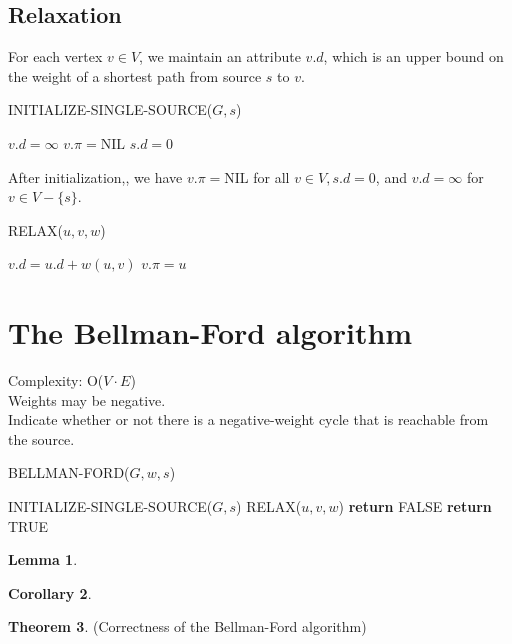\documentclass[letter]{book}
\theoremstyle{definition}
\newtheorem{theorem}{Theorem}[chapter]
\newtheorem{lemma}[theorem]{Lemma}
\newtheorem{corollary}[theorem]{Corollary}
\theoremstyle{definition}
\theoremstyle{remark}
\begin{document}
\subsection*{Relaxation}
    For each vertex $v\in V$, we maintain an attribute $v.d$, which is an upper bound on the weight of a shortest path from source $s$ to $v$.
    \begin{algorithm}[H]%
        \caption{INITIALIZE-SINGLE-SOURCE($G,s$)}
        \begin{algorithmic}[1] %
                \State $v.d=\infty$
                \State $v.\pi=\text{NIL}$
            \EndFor
            \State $s.d=0$
        \end{algorithmic}
    \end{algorithm}
    After initialization,, we have $v.\pi=$NIL for all $v\in V, s.d=0$, and $v.d=\infty$ for $v\in V-\{s\}$.
    \begin{algorithm}[H]%
        \caption{RELAX($u,v,w$)}
        \begin{algorithmic}[1] %
                \State $v.d=u.d+w(u,v)$
                \State $v.\pi=u$
            \EndIf
        \end{algorithmic}
    \end{algorithm}
    
    
\section{The Bellman-Ford algorithm}
    Complexity: O($V\cdot E$)\\
    Weights may be negative.\\
    Indicate whether or not there is a negative-weight cycle that is reachable from the source.
    \begin{algorithm}[H]%
        \caption{BELLMAN-FORD($G,w,s$)}
        \begin{algorithmic}[1] %
            \State INITIALIZE-SINGLE-SOURCE($G,s$)
                    \State RELAX($u,v,w$)
                \EndFor
            \EndFor
                    \State \textbf{return} FALSE
                \EndIf
            \EndFor
            \State \textbf{return} TRUE
        \end{algorithmic}
    \end{algorithm}
    \begin{lemma}
        
    \end{lemma}
    \bigskip
    \begin{corollary}
    \end{corollary}
    \bigskip
    \begin{theorem}(Correctness of the Bellman-Ford algorithm)
    \end{theorem}
    
\end{document}
